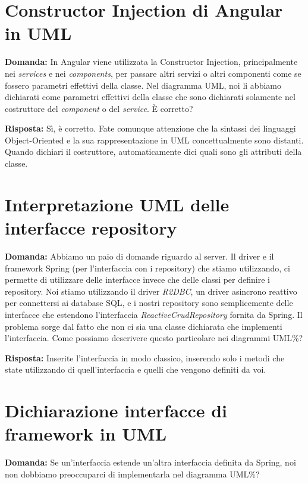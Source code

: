 \documentclass{article}
\begin{document}
\section{Constructor Injection di Angular in UML}%
\label{sec:constructor_injection_angular_uml}

\textbf{Domanda:} In Angular viene utilizzata la Constructor Injection, principalmente nei \textit{services} e nei \textit{components}, per passare altri servizi o altri componenti come se fossero parametri effettivi della classe. Nel diagramma UML, noi li abbiamo dichiarati come parametri effettivi della classe che sono dichiarati solamente nel costruttore del \textit{component} o del \textit{service}. È corretto?

\textbf{Risposta:} Sì, è corretto. Fate comunque attenzione che la sintassi dei linguaggi Object-Oriented e la sua rappresentazione in UML concettualmente sono distanti. Quando dichiari il costruttore, automaticamente dici quali sono gli attributi della classe.

\section{Interpretazione UML delle interfacce repository}%
\label{sec:interpretazione_uml_interfacce_repository}

\textbf{Domanda:} Abbiamo un paio di domande riguardo al server. Il driver e il framework Spring (per l'interfaccia con i repository) che stiamo utilizzando, ci permette di utilizzare delle interfacce invece che delle classi per definire i repository. Noi stiamo utilizzando il driver \textit{R2DBC}, un driver asincrono reattivo per connettersi ai database SQL, e i nostri repository sono semplicemente delle interfacce che estendono l'interfaccia \textit{ReactiveCrudRepository} fornita da Spring. Il problema sorge dal fatto che non ci sia una classe dichiarata che implementi l'interfaccia. Come possiamo descrivere questo particolare nei diagrammi UML\%?

\textbf{Risposta:} Inserite l'interfaccia in modo classico, inserendo solo i metodi che state utilizzando di quell'interfaccia e quelli che vengono definiti da voi.

\section{Dichiarazione interfacce di framework in UML}%
\label{sec:dichiarazione_interfacce_framework_uml}

\textbf{Domanda:} Se un'interfaccia estende un'altra interfaccia definita da Spring, noi non dobbiamo preoccuparci di implementarla nel diagramma UML\%?
\end{document}

